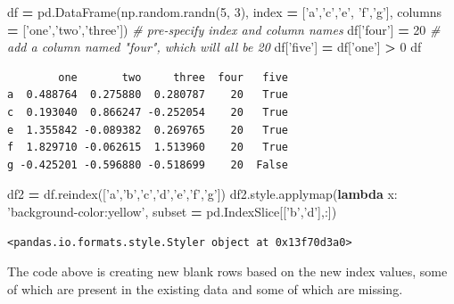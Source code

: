 \documentclass[
  letterpaper,
]{scrbook}
\newenvironment{Shaded}{\begin{snugshade}}{\end{snugshade}}
\newcommand{\CommentTok}[1]{\textcolor[rgb]{0.56,0.35,0.01}{\textit{#1}}}
\newcommand{\DecValTok}[1]{\textcolor[rgb]{0.00,0.00,0.81}{#1}}
\newcommand{\KeywordTok}[1]{\textcolor[rgb]{0.13,0.29,0.53}{\textbf{#1}}}
\newcommand{\NormalTok}[1]{#1}
\newcommand{\OperatorTok}[1]{\textcolor[rgb]{0.81,0.36,0.00}{\textbf{#1}}}
\newcommand{\StringTok}[1]{\textcolor[rgb]{0.31,0.60,0.02}{#1}}
\begin{document}
\begin{Shaded}
\begin{Highlighting}[]
\NormalTok{df }\OperatorTok{=}\NormalTok{ pd.DataFrame(np.random.randn(}\DecValTok{5}\NormalTok{, }\DecValTok{3}\NormalTok{), index }\OperatorTok{=}\NormalTok{ [}\StringTok{'a'}\NormalTok{,}\StringTok{'c'}\NormalTok{,}\StringTok{'e'}\NormalTok{, }\StringTok{'f'}\NormalTok{,}\StringTok{'g'}\NormalTok{], columns }\OperatorTok{=}\NormalTok{ [}\StringTok{'one'}\NormalTok{,}\StringTok{'two'}\NormalTok{,}\StringTok{'three'}\NormalTok{]) }\CommentTok{# pre-specify index and column names}
\NormalTok{df[}\StringTok{'four'}\NormalTok{] }\OperatorTok{=} \DecValTok{20} \CommentTok{# add a column named "four", which will all be 20}
\NormalTok{df[}\StringTok{'five'}\NormalTok{] }\OperatorTok{=}\NormalTok{ df[}\StringTok{'one'}\NormalTok{] }\OperatorTok{>} \DecValTok{0}
\NormalTok{df}
\end{Highlighting}
\end{Shaded}

\begin{verbatim}
        one       two     three  four   five
a  0.488764  0.275880  0.280787    20   True
c  0.193040  0.866247 -0.252054    20   True
e  1.355842 -0.089382  0.269765    20   True
f  1.829710 -0.062615  1.513960    20   True
g -0.425201 -0.596880 -0.518699    20  False
\end{verbatim}

\begin{Shaded}
\begin{Highlighting}[]
\NormalTok{df2 }\OperatorTok{=}\NormalTok{ df.reindex([}\StringTok{'a'}\NormalTok{,}\StringTok{'b'}\NormalTok{,}\StringTok{'c'}\NormalTok{,}\StringTok{'d'}\NormalTok{,}\StringTok{'e'}\NormalTok{,}\StringTok{'f'}\NormalTok{,}\StringTok{'g'}\NormalTok{])}
\NormalTok{df2.style.applymap(}\KeywordTok{lambda}\NormalTok{ x: }\StringTok{'background-color:yellow'}\NormalTok{, subset }\OperatorTok{=}\NormalTok{ pd.IndexSlice[[}\StringTok{'b'}\NormalTok{,}\StringTok{'d'}\NormalTok{],:])}
\end{Highlighting}
\end{Shaded}

\begin{verbatim}
<pandas.io.formats.style.Styler object at 0x13f70d3a0>
\end{verbatim}

The code above is creating new blank rows based on the new index values, some of which are present in the existing data and some of which are missing.
\end{document}
